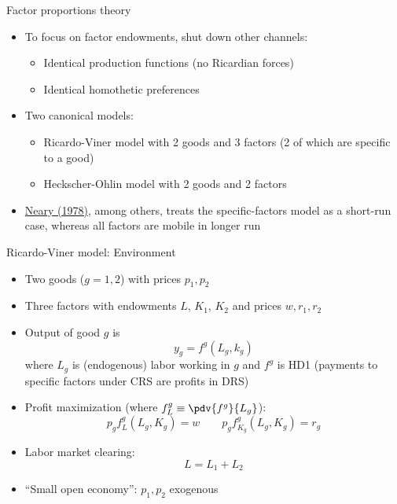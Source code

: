 \documentclass[10pt,notes=hide]{beamer}
\begin{document}
\begin{frame}{Factor proportions theory}
\begin{itemize}
	\item To focus on factor endowments, shut down other channels:
	\begin{itemize}
		\item Identical production functions (no Ricardian forces)
		\item Identical homothetic preferences
	\end{itemize}
	\item Two canonical models:
	\begin{itemize}
		\item Ricardo-Viner model with 2 goods and 3 factors (2 of which are specific to a good)
		\item Heckscher-Ohlin model with 2 goods and 2 factors
	\end{itemize}
	\item \href{https://www.jstor.org/stable/pdf/2232049.pdf}{Neary (1978)}, among others, treats the specific-factors model as a short-run case, whereas all factors are mobile in longer run
\end{itemize}
\end{frame}
\begin{frame}{Ricardo-Viner model: Environment}
\begin{itemize}
	\item Two goods ($g=1,2$) with prices $p_1,p_2$
	\item Three factors with endowments $L$, $K_1$, $K_2$ and prices $w,r_1,r_2$
	\item Output of good $g$ is
	\begin{equation*}
		y_g = f^g \left(L_g,k_g\right)
	\end{equation*}
	where $L_g$ is (endogenous) labor working in $g$ and $f^g$ is HD1
	(payments to specific factors under CRS are profits in DRS)
	\item Profit maximization (where $f^g_{L} \equiv \pdv{f^g}{L_g}$):
	\begin{equation*}
		p_g f^g_{L} \left(L_g,K_g\right) = w 
		\qquad
		p_g f^g_{K_g}\left(L_g,K_g\right) = r_g 
	\end{equation*}
	\item Labor market clearing: $$L = L_1 + L_2$$
	\item ``Small open economy'': $p_1,p_2$ exogenous
\end{itemize}
\end{frame}
\end{document}
